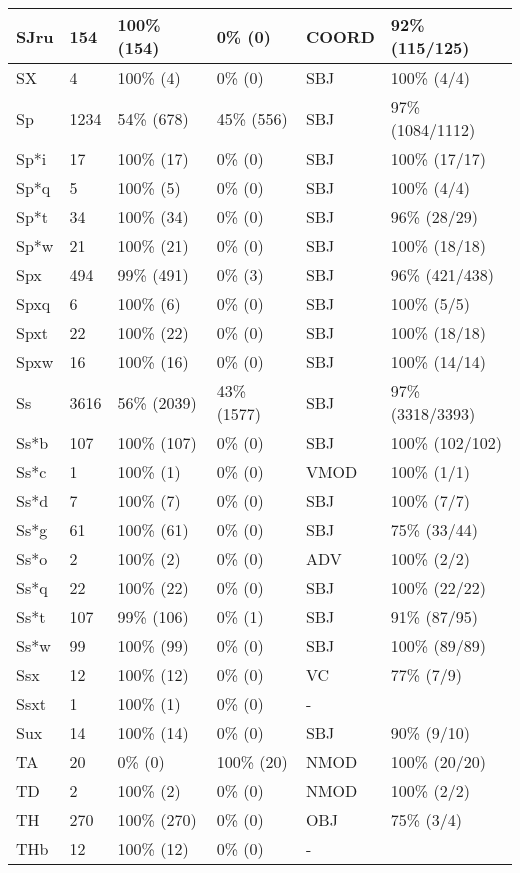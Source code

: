 \begin{figure*}
\begin{tabular}{|l|l|l|l||l|l|}
\hline
 SJru & 154 & 100\% (154) & 0\% (0) & COORD & 92\% (115/125) \\ 
\hline
 SX & 4 & 100\% (4) & 0\% (0) & SBJ & 100\% (4/4) \\ 
\hline
 Sp & 1234 & 54\% (678) & 45\% (556) & SBJ & 97\% (1084/1112) \\ 
\hline
 Sp*i & 17 & 100\% (17) & 0\% (0) & SBJ & 100\% (17/17) \\ 
\hline
 Sp*q & 5 & 100\% (5) & 0\% (0) & SBJ & 100\% (4/4) \\ 
\hline
 Sp*t & 34 & 100\% (34) & 0\% (0) & SBJ & 96\% (28/29) \\ 
\hline
 Sp*w & 21 & 100\% (21) & 0\% (0) & SBJ & 100\% (18/18) \\ 
\hline
 Spx & 494 & 99\% (491) & 0\% (3) & SBJ & 96\% (421/438) \\ 
\hline
 Spxq & 6 & 100\% (6) & 0\% (0) & SBJ & 100\% (5/5) \\ 
\hline
 Spxt & 22 & 100\% (22) & 0\% (0) & SBJ & 100\% (18/18) \\ 
\hline
 Spxw & 16 & 100\% (16) & 0\% (0) & SBJ & 100\% (14/14) \\ 
\hline
 Ss & 3616 & 56\% (2039) & 43\% (1577) & SBJ & 97\% (3318/3393) \\ 
\hline
 Ss*b & 107 & 100\% (107) & 0\% (0) & SBJ & 100\% (102/102) \\ 
\hline
 Ss*c & 1 & 100\% (1) & 0\% (0) & VMOD & 100\% (1/1) \\ 
\hline
 Ss*d & 7 & 100\% (7) & 0\% (0) & SBJ & 100\% (7/7) \\ 
\hline
 Ss*g & 61 & 100\% (61) & 0\% (0) & SBJ & 75\% (33/44) \\ 
\hline
 Ss*o & 2 & 100\% (2) & 0\% (0) & ADV & 100\% (2/2) \\ 
\hline
 Ss*q & 22 & 100\% (22) & 0\% (0) & SBJ & 100\% (22/22) \\ 
\hline
 Ss*t & 107 & 99\% (106) & 0\% (1) & SBJ & 91\% (87/95) \\ 
\hline
 Ss*w & 99 & 100\% (99) & 0\% (0) & SBJ & 100\% (89/89) \\ 
\hline
 Ssx & 12 & 100\% (12) & 0\% (0) & VC & 77\% (7/9) \\ 
\hline
 Ssxt & 1 & 100\% (1) & 0\% (0) & - &  \\ 
\hline
 Sux & 14 & 100\% (14) & 0\% (0) & SBJ & 90\% (9/10) \\ 
\hline
 TA & 20 & 0\% (0) & 100\% (20) & NMOD & 100\% (20/20) \\ 
\hline
 TD & 2 & 100\% (2) & 0\% (0) & NMOD & 100\% (2/2) \\ 
\hline
 TH & 270 & 100\% (270) & 0\% (0) & OBJ & 75\% (3/4) \\ 
\hline
 THb & 12 & 100\% (12) & 0\% (0) & - &  \\ 
\hline
\end{tabular}
\end{figure*}
